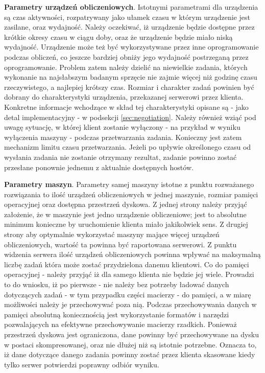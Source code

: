 \documentclass[12pt,a4paper,twoside]{article}
\begin{document}
\textbf{Parametry urządzeń obliczeniowych}. Istotnymi parametrami dla urządzenia są czas aktywności, rozpatrywany jako ułamek czasu w którym urządzenie jest zasilane, oraz wydajność. Należy oczekiwać, iż urządzenie będzie dostępne przez krótkie okresy czasu w ciągu doby, oraz że urządzenie będzie miało niską wydajność. Urządzenie może też być wykorzystywane przez inne oprogramowanie podczas obliczeń, co jeszcze bardziej obniży jego wydajność postrzeganą przez oprogramowanie. Problem zatem należy dzielić na niewielkie zadania, których wykonanie na najsłabszym badanym sprzęcie nie zajmie więcej niż godzinę czasu rzeczywistego, a najlepiej krótszy czas. Rozmiar i charakter zadań powinien być dobrany do charakterystyki urządzenia, przekazanej serwerowi przez klienta. Konkretne informacje wchodzące w skład tej charakterystyki opisane są - jako detal implementacyjny - w podsekcji \ref{sec:negotiation}. Należy również wziąć pod uwagę sytuację, w której klient zostanie wyłączony - na przykład w wyniku wyłączenia maszyny - podczas przetwarzania zadania. Konieczny jest zatem mechanizm limitu czasu przetwarzania. Jeżeli po upływie określonego czasu od wysłania zadania nie zostanie otrzymany rezultat, zadanie powinno zostać przesłane ponownie jednemu z aktualnie dostępnych hostów.

\textbf{Parametry maszyn}. Parametry samej maszyny istotne z punktu rozważanego rozwiązania to ilość urządzeń obliczeniowych w jednej maszynie, rozmiar pamięci operacyjnej oraz dostępna przestrzeń dyskowa. Z jednej strony należy przyjąć założenie, że w maszynie jest jedno urządzenie obliczeniowe; jest to absolutne minimum konieczne by uruchomienie klienta miało jakikolwiek sens. Z drugiej strony aby optymalnie wykorzystać maszyny mające więcej urządzeń obliczeniowych, wartość ta powinna być raportowana serwerowi. Z punktu widzenia serwera ilość urządzeń obliczeniowych powinna wpływać na maksymalną liczbę zadań która może zostać przydzielona danemu klientowi. Co do pamięci operacyjnej - należy przyjąć iż dla samego klienta nie będzie jej wiele. Prowadzi to do wniosku, iż po pierwsze - nie należy bez potrzeby ładować danych dotyczących zadań - w tym przypadku części macierzy - do pamięci, a w miarę możliwości należy je przechowywać poza nią. Podczas przechowywania danych w pamięci absolutną koniecznością jest wykorzystanie formatów i narzędzi pozwalających na efektywne przechowywanie macierzy rzadkich. Ponieważ przestrzeń dyskowa jest ograniczona, dane powinny być przechowywane na dysku w postaci skompresowanej, oraz nie dłużej niż są istotnie potrzebne. Oznacza to, iż dane dotyczące danego zadania powinny zostać przez klienta skasowane kiedy tylko serwer potwierdzi poprawny odbiór wyniku.
\end{document}
